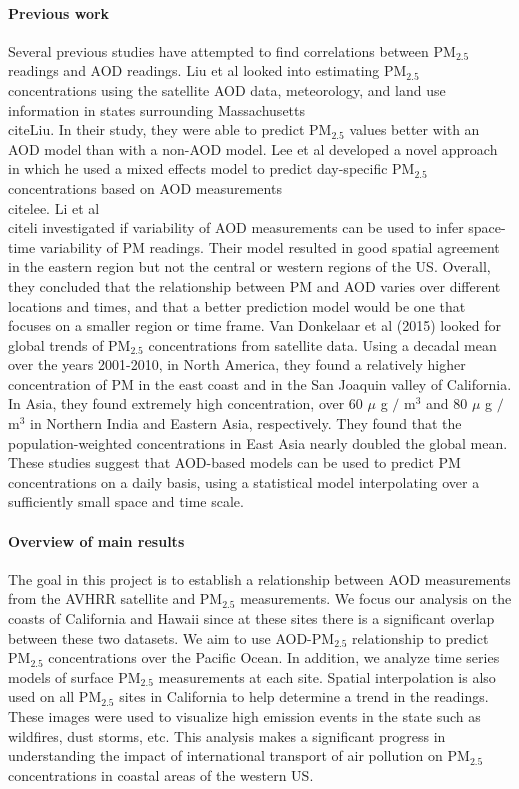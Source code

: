 \documentclass[10pt]{article}
\begin{document}
\paragraph{Previous work} Several previous studies have attempted to find
correlations between PM$_{2.5}$ readings and AOD readings. Liu et al  looked
into estimating PM$_{2.5}$ concentrations using the satellite AOD data,
meteorology, and land use information in states surrounding
Massachusetts~\\cite{Liu}. In their study, they were able to predict PM$_{2.5}$
values better with an AOD model than with a non-AOD model. Lee et al developed
a novel approach in which he used a mixed effects model to predict day-specific
PM$_{2.5}$ concentrations based on AOD measurements~\\cite{lee}. Li et
al~\\cite{li} investigated if variability of AOD measurements can be used to
infer space-time variability of PM readings. Their model resulted in good
spatial agreement in the eastern region but not the central or western regions
of the US. Overall, they concluded that the relationship between PM and AOD
varies over different locations and times, and that a better prediction model
would be one that focuses on a smaller region or time frame. Van Donkelaar et al (2015) looked for global trends of PM$_{2.5}$
concentrations from satellite data. Using a decadal mean over the years
2001-2010, in North America, they found a relatively higher concentration of PM
in the east coast and in the San Joaquin valley of California. In Asia, they
found extremely high concentration, over 60 $\mu$ g $/$ m$^3$ and 80 $\mu$ g
$/$ m$^3$ in Northern India and Eastern Asia, respectively. They found that the
population-weighted concentrations in East Asia nearly doubled the global mean.
These studies suggest that AOD-based models can be used to predict PM
concentrations on a daily basis, using a statistical model interpolating over a
sufficiently small space and time scale.

\paragraph{Overview of main results} The goal in this project is to establish a
relationship between AOD measurements from the AVHRR satellite and PM$_{2.5}$
measurements. We focus our analysis  on the coasts of California and Hawaii
since at these sites there is a significant overlap between these two datasets.
We aim to use AOD-PM$_{2.5}$ relationship to predict PM$_{2.5}$ concentrations
over the Pacific Ocean. In addition, we analyze time series models of surface
PM$_{2.5}$ measurements at each site. Spatial interpolation is also used on all
PM$_{2.5}$ sites in California to help determine a trend in the readings. These
images were used to visualize high emission events in the state such as
wildfires, dust storms, etc. This analysis makes a significant progress in 
understanding the impact of international transport of air pollution on
PM$_{2.5}$ concentrations in coastal areas of the western US.
\end{document}
